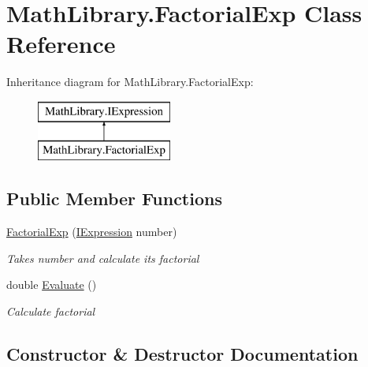 \hypertarget{class_math_library_1_1_factorial_exp}{}\section{Math\+Library.\+Factorial\+Exp Class Reference}
\label{class_math_library_1_1_factorial_exp}
Inheritance diagram for Math\+Library.\+Factorial\+Exp\+:\begin{figure}[H]
\begin{center}
\leavevmode
\includegraphics[height=2.000000cm]{class_math_library_1_1_factorial_exp}
\end{center}
\end{figure}
\subsection*{Public Member Functions}
\begin{DoxyCompactItemize}
\item 
\mbox{\hyperlink{class_math_library_1_1_factorial_exp_a90ff4919db572ec0acd7d0b3abe19cf3}{Factorial\+Exp}} (\mbox{\hyperlink{interface_math_library_1_1_i_expression}{I\+Expression}} number)
\begin{DoxyCompactList}\small\item\em Takes number and calculate it\textquotesingle{}s factorial \end{DoxyCompactList}\item 
double \mbox{\hyperlink{class_math_library_1_1_factorial_exp_aac39a4c6ddfbbd8eb6f494e97b7ff894}{Evaluate}} ()
\begin{DoxyCompactList}\small\item\em Calculate factorial \end{DoxyCompactList}\end{DoxyCompactItemize}


\subsection{Constructor \& Destructor Documentation}
\mbox{\label{class_math_library_1_1_factorial_exp_a90ff4919db572ec0acd7d0b3abe19cf3}} 
